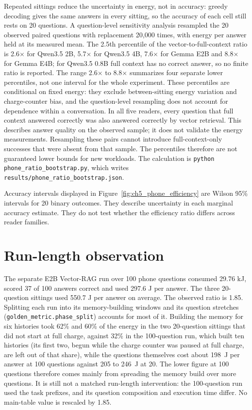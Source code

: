 Repeated sittings reduce the uncertainty in energy, not in accuracy: greedy decoding gives the
same answers in every sitting, so the accuracy of each cell still rests on 20 questions. A
question-level sensitivity analysis resampled the 20 observed paired questions with replacement
20,000 times, with energy per answer held at its measured mean. The
2.5th percentile of the vector-to-full-context ratio is 2.6$\times$ for Qwen3.5 2B, 5.7$\times$ for
Qwen3.5 4B, 7.6$\times$ for Gemma E2B and 8.8$\times$ for Gemma E4B; for Qwen3.5 0.8B full context
has no correct answer, so no finite ratio is reported. The range 2.6$\times$ to 8.8$\times$ summarizes
four separate lower percentiles, not one interval for the whole experiment. These percentiles are
conditional on fixed energy: they exclude between-sitting energy variation and charge-counter bias,
and the question-level resampling does not account for dependence within a conversation.
In all five readers, every question that full context answered correctly was also answered correctly
by vector retrieval. This describes answer quality on the observed sample; it does not validate the
energy measurements. Resampling these pairs cannot introduce full-context-only successes that were
absent from that sample. The percentiles therefore are not guaranteed lower bounds for new workloads.
The calculation is
\texttt{python phone\_ratio\_bootstrap.py}, which writes \texttt{results/phone\_ratio\_bootstrap.json}.

Accuracy intervals displayed in Figure~\ref{fig:ch5_phone_efficiency} are Wilson 95\%
intervals for 20 binary outcomes. They describe uncertainty in each marginal accuracy
estimate. They do not test whether the efficiency ratio differs across reader families.

\section{Run-length observation}
\label{app:ch5_run_length}

The separate E2B Vector-RAG run over 100 phone questions consumed 29.76 kJ, scored 37
of 100 answers correct and used 297.6 J per answer. The three 20-question sittings used
550.7 J per answer on average. The observed ratio is 1.85. Splitting each run into its
memory-building windows and its question stretches (\texttt{golden\_metric.phase\_split})
accounts for most of it. Building the memory for six histories took 62\% and 60\% of the
energy in the two 20-question sittings that did not start at full charge, against 32\% in the
100-question run, which built ten histories (its first two, begun while the charge counter was
paused at full charge, are left out of that share), while the questions themselves cost about 198~J per
answer at 100 questions against 205 to 246~J at 20. The lower figure at 100 questions therefore
comes mainly from spreading the memory build over more questions. It is still not a matched
run-length intervention: the 100-question run used the task prefixes, and its question
composition and execution time differ. No main-table value is rescaled by 1.85.


